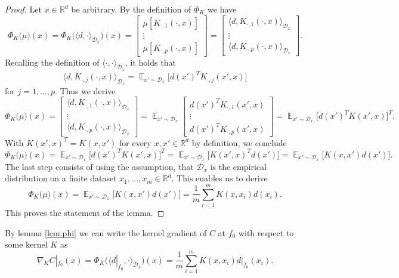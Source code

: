 \documentclass[11pt, a4paper]{article}
\newcommand{\R}{\mathds{R}}
\newcommand{\D}{\mathcal{D}}
\DeclareMathOperator*{\E}{\mathds{E}}
\begin{document}
\begin{proof}
Let $x \in \R^d$ be arbitrary. By the definition of $\Phi_K$ we have
\[ \Phi_K \big ( \mu \big )(x) = \Phi_K \Big ( \langle d, \cdot \rangle_{\D_x} \Big )(x) = \begin{bmatrix} \mu [K_{\cdot,1}(\cdot,x) ] \\ \vdots \\ \mu [ K_{\cdot,p}(\cdot,x)] \end{bmatrix} = \begin{bmatrix} \big \langle d, K_{\cdot,1}(\cdot,x) \big \rangle_{\D_x} \\ \vdots \\ \big \langle d, K_{\cdot,p}(\cdot,x) \big \rangle_{\D_x} \end{bmatrix}. \]
Recalling the definition of $\langle \cdot , \cdot \rangle_{\D_x}$, it holds that
\[ \big \langle d, K_{\cdot,j}(\cdot,x) \big \rangle_{\D_x} = \E_{x' \sim \D_x} \Big [ d(x')^TK_{\cdot,j}(x',x) \Big ] \]
for $j = 1, \dots, p$. Thus we derive
\[ \Phi_K \big ( \mu \big )(x) = \begin{bmatrix} \big \langle d, K_{\cdot,1}(\cdot,x) \big \rangle_{\D_x} \\ \vdots \\ \big \langle d, K_{\cdot,p}(\cdot,x) \big \rangle_{\D_x} \end{bmatrix} = \E_{x' \sim \D_x} \begin{bmatrix} d(x')^TK_{\cdot,1}(x',x) \\ \vdots \\ d(x')^TK_{\cdot,p}(x',x) \end{bmatrix} = \E_{x' \sim \D_x} \Big [ d(x')^T K(x',x) \Big ]^T. \]
With $K(x',x)^T = K(x,x')$ for every $x,x' \in \R^d$ by definition, we conclude
\[ \Phi_K \big ( \mu \big )(x) = \E_{x' \sim \D_x} \Big [ d(x')^T K(x',x) \Big ]^T = \E_{x' \sim \D_x} \Big [ K(x',x)^Td(x') \Big ] = \E_{x' \sim \D_x} \Big [ K(x,x')d(x') \Big ]. \]
The last step consists of using the assumption, that $\D_x$ is the empirical distribution on a finite dataset $x_1, \dots, x_m \in \R^d$. This enables us to derive
\[ \Phi_K \big ( \mu \big )(x) = \E_{x' \sim \D_x} \Big [ K(x,x')d(x') \Big ] = \frac{1}{m}\sum_{i=1}^{m} K(x,x_i)d(x_i). \]
This proves the statement of the lemma.
\end{proof}

By lemma \ref{lem:phi} we can write the kernel gradient of $C$ at $f_0$ with respect to some kernel $K$ as
\[ \nabla_KC|_{f_0}(x) = \Phi_K \Big ( \big \langle d|_{f_0} , \cdot \big \rangle_{\D_x} \Big )(x) = \frac{1}{m} \sum_{i=1}^{m} K(x,x_i)d|_{f_0}(x_i). \]
\end{document}
